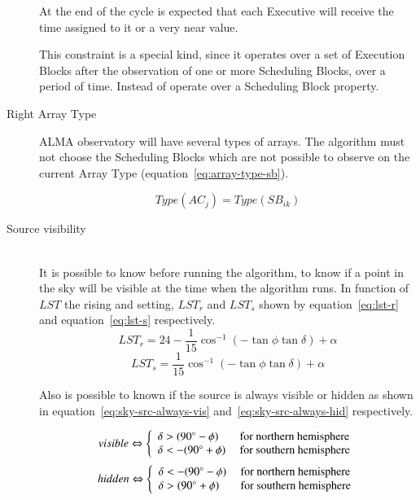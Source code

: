 \begin{description}
At the end of the cycle is expected that each Executive will receive the time assigned to it or a very near value. 

This constraint is a special kind, since it operates over a set of Execution Blocks after the observation of one or more Scheduling Blocks, over a period of time. Instead of operate over a Scheduling Block property.

\item[Right Array Type]
ALMA observatory will have several types of arrays. The algorithm must not choose the Scheduling Blocks which are not possible to observe on the current Array Type (equation~\ref{eq:array-type-sb}).

\begin{equation}
\label{eq:array-type-sb}
Type(AC_j) = Type(SB_{ik})
\end{equation}


\item[Source visibility] \hfill \\
It is possible to know before running the algorithm, to know if a point in the sky will be visible at the time when the algorithm runs.
In function of $LST$ the rising and setting, $LST_r$ and $LST_s$ shown by equation~\ref{eq:lst-r} and equation~\ref{eq:lst-s} respectively.
\begin{equation}
\label{eq:lst-r}
LST_r =  24 - \frac{1}{15} \cos^{-1} (-\tan\phi\tan\delta) + \alpha
\end{equation}
\begin{equation}
\label{eq:lst-s}
LST_s = \frac{1}{15} \cos^{-1} (-\tan\phi \tan\delta) + \alpha
\end{equation}

Also is possible to known if the source is always visible or hidden as shown in equation~\ref{eq:sky-src-always-vis} and~\ref{eq:sky-src-always-hid} respectively.

\begin{equation}
\label{eq:sky-src-always-vis}
visible \Leftrightarrow
\left\{
	\begin{array} {l l}
	\delta > (90^\circ - \phi) & \mbox{ for northern hemisphere} \\
	\delta < -(90^\circ + \phi) & \mbox{ for southern hemisphere} \\
	\end{array} 
\right.
\end{equation}
\begin{equation}
\label{eq:sky-src-always-hid}
hidden \Leftrightarrow
\left\{
	\begin{array} {l l}
	\delta < -(90^\circ - \phi) & \mbox{ for northern hemisphere} \\
	\delta > (90^\circ + \phi) & \mbox{ for southern hemisphere} \\
	\end{array} 
\right.
\end{equation}


\end{description}
